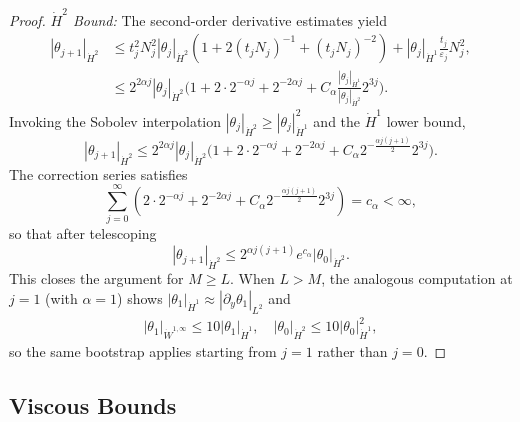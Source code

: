 \documentclass[12pt]{report}   %
\renewcommand{\le}{\leqslant}
\renewcommand{\ge}{\geqslant}
\numberwithin{equation}{section}
\theoremstyle{plain}
\theoremstyle{definition}
\theoremstyle{remark}
\newcommand{\eps}{{\varepsilon}}
\newcommand{\rd}{\partial}
\begin{document}
\begin{proof}
\emph{$\dot{H}^2$ Bound:}
The second-order derivative estimates yield
\begin{align*}
|\theta _{j+1}|_{\dot{H}^2} &\le t_j^2 N_j^2|\theta _j|_{\dot H^2}
({ 1 + 2(t_jN_j)^{-1} + (t_jN_j)^{-2} }) +|\theta _j|_{\dot{H}^1}\frac{t_j}{\eps_j} N_j^2, \\
&\le  2^{2{\alpha}j}|\theta _j|_{{\dot{H}^2}}\Big(1+ 2 \cdot 2^{-\alpha j} + 2^{-2\alpha j} + C_\alpha \frac{|\theta _j|_{{\dot{H}^1}}}{|\theta _j|_{{\dot{H}^2}}}2^{3j}\Big).
\end{align*}
Invoking the Sobolev interpolation $|\theta _j|_{{\dot{H}^2}}\ge |\theta _j|_{{\dot{H}^1}}^2$ and the $\dot{H}^1$ lower bound,
\[|\theta _{j+1}|_{{\dot{H}^2}}\le 2^{2{\alpha}j}|\theta _j|_{{\dot{H}^2}}\Big(1+ {2 \cdot 2^{-{\alpha}j} + 2^{-2{\alpha}j} + } {C_\alpha} 2^{-\frac{{\alpha} j(j+1)}{2}} 2^{3j}\Big).\]
The correction series satisfies \[\sum_{j=0}^\infty ({2\cdot 2^{-{\alpha}j} + 2^{-2{\alpha}j} + }{C_\alpha}2^{-\frac{{\alpha}j(j+1)}{2}} 2^{3j})=c_\alpha<\infty,\]
so that after telescoping
\[|\theta _{j+1}|_{{\dot{H}^2}}\le 2^{{\alpha}j(j+1)} e^{{c_\alpha}}{|\theta_0|_{\dot{H}^2}}.\]
This closes the argument for $M \ge L$. When $L > M$, the analogous computation at $j=1$ (with $\alpha = 1$) shows $|\theta_1|_{\dot{H}^1} \approx |\rd_y \theta_1|_{L^2}$ and
\begin{equation*}
	\begin{split}
	|\theta_1|_{\dot{W}^{1,\infty}} \le 10|\theta_1|_{\dot{H}^1},\quad |\theta_0|_{\dot{H}^2} \le 10|\theta_0|_{\dot{H}^1}^2,
	\end{split}
	\end{equation*}
so the same bootstrap applies starting from $j = 1$ rather than $j = 0$.
\end{proof}

\subsection{Viscous Bounds}
\end{document}
